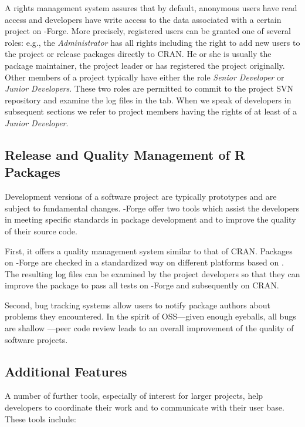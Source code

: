 A rights management system assures that by default, anonymous users
have read access and developers have write access to the data associated with 
a certain project on \R{}-Forge. More precisely, registered users can
be granted one of several roles: e.g., the \textit{Administrator} has
all rights including the right to 
add new users to the project or release packages directly to CRAN. He
or she is usually the package 
maintainer, the project leader or has registered the project originally.
Other members of a project typically have either the role \textit{Senior 
Developer} or \textit{Junior Developers}. These two roles are
permitted to commit to the project 
SVN repository and examine the log files in the  tab.
When we speak of developers in subsequent sections we refer to project
members having the rights of at least of a \textit{Junior Developer}.


\subsection{Release and Quality Management of R Packages}
\label{sec:release_and_quality_management}

Development versions of a software project are typically
prototypes and are subject to fundamental changes. \R{}-Forge offer
two tools which assist the developers in meeting specific standards in
\R{} package development and to improve the quality of their source
code. 

First, it offers a quality management system similar to 
that of CRAN. Packages on \R{}-Forge are checked in a
standardized way on different platforms based on
. The resulting log files can be examined by the
project developers so that they can improve
the package to pass all tests on \R{}-Forge and subsequently on CRAN.

Second, bug tracking systems allow users to notify
package authors about problems they encountered. In the spirit of
OSS---given enough eyeballs, all bugs are shallow
\citep{forge:Raymond:1999}---peer code review leads to an 
overall improvement of the quality of software projects.

\subsection{Additional Features}

A number of further tools, especially of interest for larger
projects, help developers to coordinate their work and to communicate
with their user base. These tools include:

